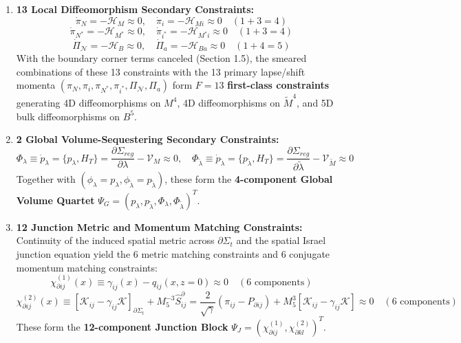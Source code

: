 \documentclass[aps,prd,onecolumn,superscriptaddress,nofootinbib,longbibliography,10pt]{revtex4-2}
\begin{document}
  
\begin{enumerate}
    
\item \textbf{13 Local Diffeomorphism Secondary Constraints:}
    \[ \dot{\pi}_N = -\mathcal{H}_M \approx 0, \quad \dot{\pi}_i = -\mathcal{H}_{Mi} \approx 0 \quad (1 + 3 = 4) \]
    \[ \dot{\pi}_{N^*} = -\mathcal{H}_{M^*} \approx 0, \quad \dot{\pi}_{i^*} = -\mathcal{H}_{M^*i} \approx 0 \quad (1 + 3 = 4) \]
    \[ \dot{\Pi}_{\mathcal{N}} = -\mathcal{H}_B \approx 0, \quad \dot{\Pi}_a = -\mathcal{H}_{Ba} \approx 0 \quad (1 + 4 = 5) \]
    With the boundary corner terms canceled (Section 1.5), the smeared combinations of these 13 constraints with the 13 primary lapse/shift momenta \((\pi_N, \pi_i, \pi_{N^*}, \pi_{i^*}, \Pi_{\mathcal{N}}, \Pi_a)\) form \(F = 13\) \textbf{first-class constraints} generating 4D diffeomorphisms on \(M^4\), 4D diffeomorphisms on \(\tilde{M}^4\), and 5D bulk diffeomorphisms on \(B^5\).
    
\item \textbf{2 Global Volume-Sequestering Secondary Constraints:}
    \[ \Phi_\lambda \equiv \dot{p}_\lambda = \{p_\lambda, H_T\} = \frac{\partial\Sigma_{reg}}{\partial\lambda} - \mathcal{V}_M \approx 0, \quad \Phi_{\tilde{\lambda}} \equiv \dot{p}_{\tilde{\lambda}} = \{p_{\tilde{\lambda}}, H_T\} = \frac{\partial\Sigma_{reg}}{\partial\tilde{\lambda}} - \mathcal{V}_{\tilde{M}} \approx 0 \]
    Together with \((\phi_\lambda = p_\lambda, \phi_{\tilde{\lambda}} = p_{\tilde{\lambda}})\), these form the \textbf{4-component Global Volume Quartet} \(\Psi_G = (p_\lambda, p_{\tilde{\lambda}}, \Phi_\lambda, \Phi_{\tilde{\lambda}})^T\).
    
\item \textbf{12 Junction Metric and Momentum Matching Constraints:} Continuity of the induced spatial metric across \(\partial\Sigma_t\) and the spatial Israel junction equation yield the 6 metric matching constraints and 6 conjugate momentum matching constraints:
    \[ \chi_{\partial ij}^{(1)}(x) \equiv \gamma_{ij}(x) - q_{ij}(x, z=0) \approx 0 \quad (6\text{ components}) \]
    \[ \chi_{\partial ij}^{(2)}(x) \equiv [\mathcal{K}_{ij} - \gamma_{ij}\mathcal{K}]_{\partial\Sigma_t} + M_5^{-3}\hat{S}^\partial_{ij} = \frac{2}{\sqrt{\gamma}}(\pi_{ij} - P_{\partial ij}) + M_5^3[\mathcal{K}_{ij} - \gamma_{ij}\mathcal{K}] \approx 0 \quad (6\text{ components}) \]
    These form the \textbf{12-component Junction Block} \(\Psi_J = (\chi_{\partial ij}^{(1)}, \chi_{\partial kl}^{(2)})^T\).
    

\end{enumerate}
\end{document}
